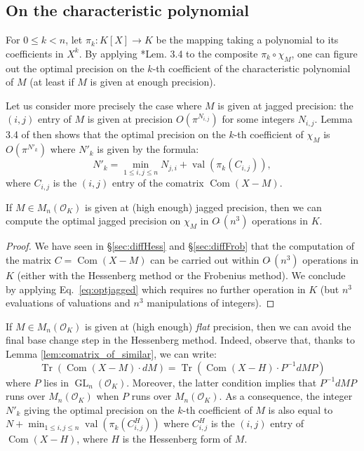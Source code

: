\documentclass{sig-alternate-05-2015}
\DeclareMathOperator{\GL}{GL}
\DeclareMathOperator{\val}{val}
\DeclareMathOperator{\tr}{Tr}
\DeclareMathOperator{\com}{Com}
\newcommand{\OK}{\mathcal{O}_K}
\newcommand{\softO}{O\tilde{~}}
\begin{document}
\subsection{On the characteristic polynomial}

For $0 \leq k < n$, let $\pi_k : K[X] \to K$ be the mapping taking a 
polynomial to its coefficients in $X^k$. By applying 
\cite{caruso-roe-vaccon:14a}*{Lem. 3.4} to the composite $\pi_k 
\circ \chi_M$, one can figure out the optimal precision on the
$k$-th coefficient of the characteristic polynomial of $M$ (at
least if $M$ is given at enough precision).

Let us consider more precisely the case where $M$ is given at 
jagged precision: the $(i,j)$ entry of $M$ is given at precision 
$O(\pi^{N_{i,j}})$ for some integers $N_{i,j}$. 
Lemma 3.4 of \cite{caruso-roe-vaccon:14a} then shows that
the optimal precision on the $k$-th coefficient of $\chi_M$ is 
$O(\pi^{N'_k})$ where $N'_k$ is given by the formula:
\begin{equation}
\label{eq:optjagged}
N'_k = \min_{1 \leq i, j\leq n} N_{j,i} + \val(\pi_k(C_{i,j})),
\end{equation}
where $C_{i,j}$ is the $(i,j)$ entry of the comatrix $\com(X{-}M)$.

\begin{prop} \label{prop:optimal_jagged}
If $M \in M_n(\OK)$ is given at (high enough) jagged precision, 
then we can compute the optimal jagged precision on $\chi_M$ in 
$\softO (n^3)$ operations in $K$.
\end{prop}

\begin{proof}
We have seen in \S \ref{sec:diffHess} and \S \ref{sec:diffFrob}
that the computation of the matrix $C = \com(X{-}M)$ can be carried out 
within $\softO(n^3)$ operations in $K$ (either with the Hessenberg 
method or the Frobenius method). We conclude by applying 
Eq.~\eqref{eq:optjagged} which requires no further operation in $K$
(but $n^3$ evaluations of valuations and $n^3$ manipulations of 
integers).
\end{proof}

\begin{rem}
If $M \in M_n(\OK)$ is given at (high enough) \emph{flat} precision, 
then we can avoid the final base change step in the Hessenberg method.
Indeed, observe that, thanks to Lemma \ref{lem:comatrix_of_similar}, 
we can write:
$$\tr(\com (X{-}M) \cdot dM)=\tr(\com (X{-}H)\cdot P^{-1} dM P)$$
where $P$ lies in $\GL_n(\OK)$. Moreover, the latter condition implies
that $P^{-1} dM P$ runs over $M_n(\OK)$ when $P$ runs over $M_n(\OK)$.
As a consequence, the integer $N'_k$ giving the optimal precision on the 
$k$-th coefficient of $M$ is also equal to
$N + \min_{1 \leq i, j\leq n} \val(\pi_k(C^H_{i,j}))$
where $C^H_{i,j}$ is the $(i,j)$ entry of $\com(X{-}H)$,
where $H$ is the Hessenberg form of $M$.
\end{rem}
\end{document}

